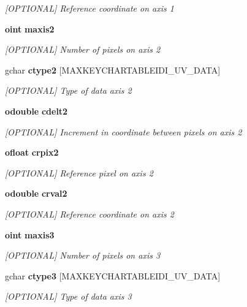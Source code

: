 \begin{CompactItemize}
\begin{CompactList}\small\item\em [OPTIONAL] Reference coordinate on axis 1 \item\end{CompactList}\item 
{\bf oint} {\bf maxis2}
\begin{CompactList}\small\item\em [OPTIONAL] Number of pixels on axis 2 \item\end{CompactList}\item 
gchar {\bf ctype2} [MAXKEYCHARTABLEIDI\_\-UV\_\-DATA]
\begin{CompactList}\small\item\em [OPTIONAL] Type of data axis 2 \item\end{CompactList}\item 
{\bf odouble} {\bf cdelt2}
\begin{CompactList}\small\item\em [OPTIONAL] Increment in coordinate between pixels on axis 2 \item\end{CompactList}\item 
{\bf ofloat} {\bf crpix2}
\begin{CompactList}\small\item\em [OPTIONAL] Reference pixel on axis 2 \item\end{CompactList}\item 
{\bf odouble} {\bf crval2}
\begin{CompactList}\small\item\em [OPTIONAL] Reference coordinate on axis 2 \item\end{CompactList}\item 
{\bf oint} {\bf maxis3}
\begin{CompactList}\small\item\em [OPTIONAL] Number of pixels on axis 3 \item\end{CompactList}\item 
gchar {\bf ctype3} [MAXKEYCHARTABLEIDI\_\-UV\_\-DATA]
\begin{CompactList}\small\item\em [OPTIONAL] Type of data axis 3 \item\end{CompactList}\item 

\end{CompactItemize}
